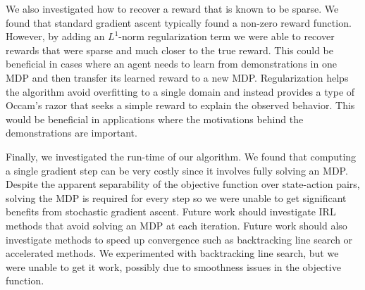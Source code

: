 \documentclass[10pt,a4paper]{article}
\begin{document}
We also investigated how to recover a reward that is known to be sparse. We found that standard gradient ascent typically found a non-zero reward function. However, by adding an $L^1$-norm regularization term we were able to recover rewards that were sparse and much closer to the true reward. This could be beneficial in cases where an agent needs to learn from demonstrations in one MDP and then transfer its learned reward to a new MDP. Regularization helps the algorithm avoid overfitting to a single domain and instead provides a type of Occam's razor that seeks a simple reward to explain the observed behavior. This would be beneficial in applications where the motivations behind the demonstrations are important.

Finally, we investigated the run-time of our algorithm. We found that computing a single gradient step can be very costly since it involves fully solving an MDP. Despite the apparent separability of the objective function over state-action pairs, solving the MDP is required for every step so we were unable to get significant benefits from stochastic gradient ascent. Future work should investigate IRL methods that avoid solving an MDP at each iteration. Future work should also investigate methods to speed up convergence such as backtracking line search or accelerated methods. We experimented with backtracking line search, but we were unable to get it work, possibly due to smoothness issues in the objective function.




\end{document}
